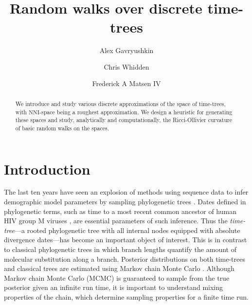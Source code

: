 \documentclass{amsart}
\theoremstyle{definition}
\newcommand{\nni}{\mathrm{NNI}}
\begin{document}
\title{Random walks over discrete time-trees}

\author{Alex Gavryushkin}
\address{Department of Computer Science, The University of Auckland, New Zealand}

\author{Chris Whidden}
\address{Program in Computational Biology, Fred Hutchinson Cancer Research Center, Seattle, WA 98109}

\author{Frederick A Matsen IV}


\begin{abstract}
We introduce and study various discrete approximations of the space of time-trees, with $\nni$-space being a roughest approximation.
We design a heuristic for generating these spaces and study, analytically and computationally, the Ricci-Ollivier curvature of basic random walks on the spaces.
\end{abstract}


\maketitle


\section{Introduction}
The last ten years have seen an explosion of methods using sequence data to infer demographic model parameters by sampling phylogenetic trees \autocite{Kuhner1995-mj,Kuhner1998-tq,Kuhner2000-af,Beerli2001-sc,Kuhner2006-vx,Drummond2002,Drummond2005-ks,Drummond2006-oa,Minin2008-wz}.
Dates defined in phylogenetic terms, such as time to a most recent common ancestor of human HIV group M viruses \autocite{Worobey2008-rt,Baele2013-op}, are essential parameters of such inference.
Thus the {\em time-tree}---a rooted phylogenetic tree with all internal nodes equipped with absolute divergence dates---has become an important object of interest.
This is in contrast to classical phylogenetic trees in which branch lengths quantify the amount of molecular substitution along a branch.
Posterior distributions on both time-trees and classical trees are estimated using Markov chain Monte Carlo \autocite{Mau1997-sq,Yang1997-gv,Drummond2002}.
Although Markov chain Monte Carlo (MCMC) is guaranteed to sample from the true posterior given an infinite run time, it is important to understand mixing properties of the chain, which determine sampling properties for a finite time run.
\end{document}

